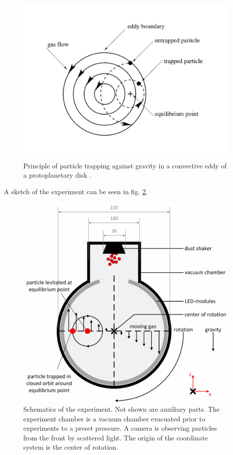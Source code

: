 \begin{figure}[h]
\includegraphics[width=\columnwidth]{eddy.pdf}
    \caption{\label{fig.eddy} Principle of particle trapping against gravity in a convective eddy of a protoplanetary disk \citep{klahr1997}. }
\end{figure}
A sketch of the experiment can be seen in fig. \ref{fig.setup}.
\begin{figure}[h]
\includegraphics[width=\columnwidth]{setup.pdf}
    \caption{\label{fig.setup} Schematics of the experiment. Not shown are auxiliary parts. The experiment chamber is a vacuum chamber evacuated prior to experiments to a preset pressure. A camera is observing particles from the front by scattered light. {The origin of the coordinate system is the center of rotation.}}
\end{figure}


